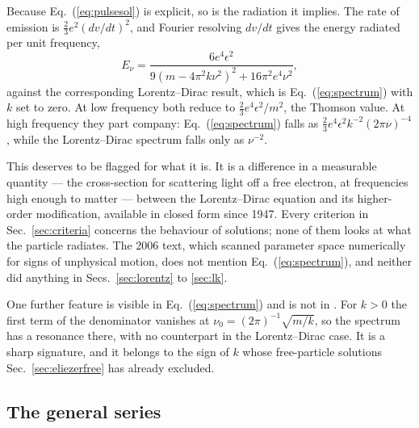 \documentclass[preprint]{aastex701}
\begin{document}
Because Eq.~(\ref{eq:pulsesol}) is explicit, so is the radiation it implies.
The rate of emission is $\tfrac23e^2(dv/dt)^2$, and Fourier resolving $dv/dt$
gives the energy radiated per unit frequency,
\begin{equation}
E_\nu = \frac{6e^4\epsilon^2}
{9\left(m-4\pi^2k\nu^2\right)^2 + 16\pi^2e^4\nu^2},
\label{eq:spectrum}
\end{equation}
against the corresponding Lorentz--Dirac result, which is
Eq.~(\ref{eq:spectrum}) with $k$ set to zero. At low frequency both reduce to
$\tfrac23e^4\epsilon^2/m^2$, the Thomson value. At high frequency they part
company: Eq.~(\ref{eq:spectrum}) falls as
$\tfrac23e^4\epsilon^2k^{-2}(2\pi\nu)^{-4}$, while the Lorentz--Dirac spectrum
falls only as $\nu^{-2}$.

This deserves to be flagged for what it is. It is a difference in a measurable
quantity --- the cross-section for scattering light off a free electron, at
frequencies high enough to matter --- between the Lorentz--Dirac equation and
its higher-order modification, available in closed form since 1947. Every
criterion in Sec.~\ref{sec:criteria} concerns the behaviour of solutions;
none of them looks at what the particle radiates. The 2006 text, which
scanned parameter space numerically for signs of unphysical motion, does not
mention Eq.~(\ref{eq:spectrum}), and neither did anything in
Secs.~\ref{sec:lorentz} to \ref{sec:lk}.

One further feature is visible in Eq.~(\ref{eq:spectrum}) and is not in
\citet{eliezer1947}. For $k>0$ the first term of the denominator vanishes at
$\nu_0 = (2\pi)^{-1}\sqrt{m/k}$, so the spectrum has a resonance there, with no
counterpart in the Lorentz--Dirac case. It is a sharp signature, and it belongs
to the sign of $k$ whose free-particle solutions Sec.~\ref{sec:eliezerfree}
has already excluded.

\subsection{The general series}
\label{sec:Bexpand}
\end{document}
